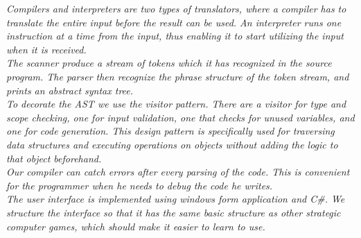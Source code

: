 \vspace{30pt}

\textit{Compilers and interpreters are two types of translators, where a compiler has to translate the entire input before the result can be used. An interpreter runs one instruction at a time from the input, thus enabling it to start utilizing the input when it is received.\\ \indent
  The scanner produce a stream of tokens which it has recognized in the source program. The parser then recognize the phrase structure of the token stream, and prints an abstract syntax tree.\\ \indent
  To decorate the AST we use the visitor pattern. There are a visitor for type and scope checking, one for input validation, one that checks for unused variables, and one for code generation.
This design pattern is specifically used for traversing data structures and executing operations on objects without adding the logic to that object beforehand.\\ \indent
  Our compiler can catch errors after every parsing of the code. This is convenient for the programmer when he needs to debug the code he writes.\\ \indent
  The user interface is implemented using windows form application and C\#. We structure the interface so that it has the  same basic structure as other strategic computer games, which should make it easier to learn to use.}